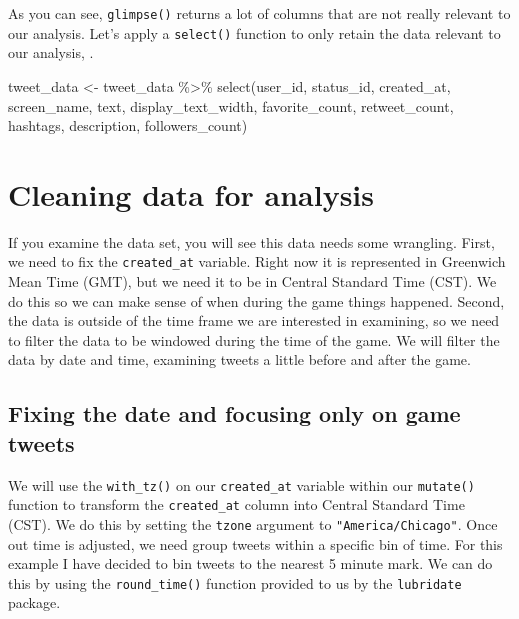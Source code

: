 \documentclass[
]{book}
\newenvironment{Shaded}{\begin{snugshade}}{\end{snugshade}}
\newcommand{\FunctionTok}[1]{\textcolor[rgb]{0.00,0.00,0.00}{#1}}
\newcommand{\NormalTok}[1]{#1}
\newcommand{\OtherTok}[1]{\textcolor[rgb]{0.56,0.35,0.01}{#1}}
\newcommand{\SpecialCharTok}[1]{\textcolor[rgb]{0.00,0.00,0.00}{#1}}
\begin{document}
As you can see, \texttt{glimpse()} returns a lot of columns that are not really relevant to our analysis. Let's apply a \texttt{select()} function to only retain the data relevant to our analysis, .

\begin{Shaded}
\begin{Highlighting}[]
\NormalTok{tweet\_data }\OtherTok{\textless{}{-}}\NormalTok{ tweet\_data }\SpecialCharTok{\%\textgreater{}\%} 
  \FunctionTok{select}\NormalTok{(user\_id, status\_id, created\_at, screen\_name, text, display\_text\_width,}
\NormalTok{         favorite\_count, retweet\_count, hashtags, description, followers\_count)}
\end{Highlighting}
\end{Shaded}

\hypertarget{cleaning-data-for-analysis}{%
\section{Cleaning data for analysis}\label{cleaning-data-for-analysis}}

If you examine the data set, you will see this data needs some wrangling. First, we need to fix the \texttt{created\_at} variable. Right now it is represented in Greenwich Mean Time (GMT), but we need it to be in Central Standard Time (CST). We do this so we can make sense of when during the game things happened. Second, the data is outside of the time frame we are interested in examining, so we need to filter the data to be windowed during the time of the game. We will filter the data by date and time, examining tweets a little before and after the game.

\hypertarget{fixing-the-date-and-focusing-only-on-game-tweets}{%
\subsection{Fixing the date and focusing only on game tweets}\label{fixing-the-date-and-focusing-only-on-game-tweets}}

We will use the \texttt{with\_tz()} on our \texttt{created\_at} variable within our \texttt{mutate()} function to transform the \texttt{created\_at} column into Central Standard Time (CST). We do this by setting the \texttt{tzone} argument to \texttt{"America/Chicago"}. Once out time is adjusted, we need group tweets within a specific bin of time. For this example I have decided to bin tweets to the nearest 5 minute mark. We can do this by using the \texttt{round\_time()} function provided to us by the \texttt{lubridate} package.
\end{document}
